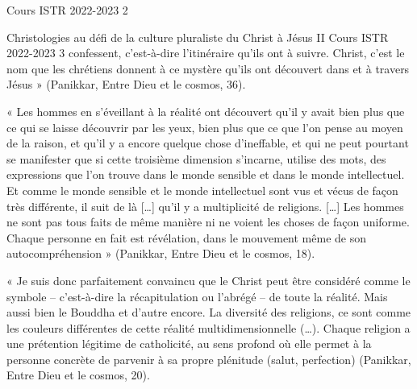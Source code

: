 Cours ISTR 2022-2023                 2

Christologies au défi de la culture pluraliste                          du Christ à Jésus II
Cours ISTR 2022-2023                 3
confessent, c’est-à-dire l’itinéraire qu’ils ont à suivre. Christ, c’est le nom que les chrétiens 
donnent à ce mystère qu’ils ont découvert dans et à travers Jésus » (Panikkar, Entre Dieu et le 
cosmos, 36).

« Les hommes en s’éveillant à la réalité ont découvert qu’il y avait bien plus que ce qui se laisse 
découvrir par les yeux, bien plus que ce que l’on pense au moyen de la raison, et qu’il y a encore 
quelque chose d’ineffable, et qui ne peut pourtant se manifester que si cette troisième dimension 
s’incarne, utilise des mots, des expressions que l’on trouve dans le monde sensible et dans le 
monde intellectuel. Et comme le monde sensible et le monde intellectuel sont vus et vécus de façon 
très différente, il suit de là […] qu’il y a multiplicité de religions. […] Les hommes ne sont pas 
tous faits de même manière ni ne voient les choses de façon uniforme. Chaque  personne  en  fait  
est  révélation,  dans  le  mouvement  même  de  son autocompréhension » (Panikkar, Entre Dieu et 
le cosmos, 18).

« Je suis donc parfaitement convaincu que le Christ peut être considéré comme le symbole – 
c’est-à-dire la récapitulation ou l’abrégé – de toute la réalité. Mais aussi bien le Bouddha et 
d’autre encore. La diversité des religions, ce sont comme les couleurs différentes de cette réalité 
multidimensionnelle (…). Chaque religion a une prétention légitime de catholicité, au sens profond 
où elle permet à la personne concrète de parvenir à sa propre plénitude (salut,
perfection) (Panikkar, Entre Dieu et le cosmos, 20).
